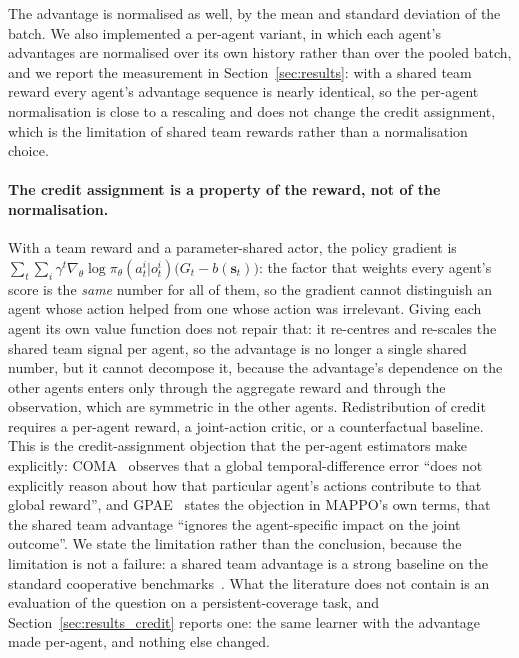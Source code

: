 \documentclass[conference]{IEEEtran}
\begin{document}
The advantage is normalised as well, by the mean and standard deviation of the batch. We also implemented a per-agent variant, in which each agent's advantages are normalised over its own history rather than over the pooled batch, and we report the measurement in Section~\ref{sec:results}: with a shared team reward every agent's advantage sequence is nearly identical, so the per-agent normalisation is close to a rescaling and does not change the credit assignment, which is the limitation of shared team rewards rather than a normalisation choice.

\paragraph{The credit assignment is a property of the reward, not of the
normalisation.} With a team reward and a parameter-shared actor, the
policy gradient is $\sum_t\sum_i\gamma^t\nabla_\theta\log\pi_\theta(a_t^i|o_t^i)
\bigl(G_t-b(\mathbf s_t)\bigr)$: the factor that weights every agent's
score is the \emph{same} number for all of them, so the gradient cannot
distinguish an agent whose action helped from one whose action was
irrelevant. Giving each agent its own value function does not repair
that: it re-centres and re-scales the shared team signal per agent,
so the advantage is no longer a single shared number, but it cannot
decompose it, because the advantage's dependence on the other agents
enters only through the aggregate reward and through the observation,
which are symmetric in the other agents. Redistribution of credit
requires a per-agent reward, a joint-action critic, or a
counterfactual baseline. This is the credit-assignment objection that the per-agent
estimators make explicitly: COMA~\cite{foerster2018} observes that a
global temporal-difference error ``does not explicitly reason about how
that particular agent's actions contribute to that global reward'', and
GPAE~\cite{kim2026} states the objection in MAPPO's own terms, that the
shared team advantage ``ignores the agent-specific impact on the joint
outcome''. We state the limitation rather than the conclusion, because the
limitation is not a failure: a shared team advantage is a strong baseline on
the standard cooperative benchmarks~\cite{yu2022,dewitt2021}. What the
literature does not contain is an evaluation of the question on a
persistent-coverage task, and Section~\ref{sec:results_credit} reports one:
the same learner with the advantage made per-agent, and nothing else
changed.
\end{document}
